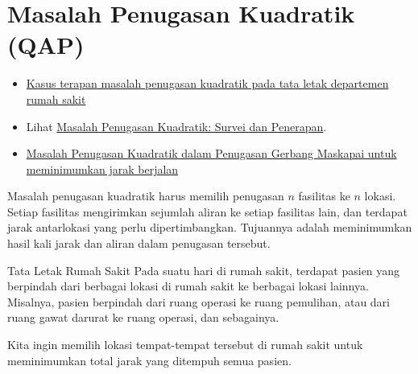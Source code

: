 \section{Masalah Penugasan Kuadratik (QAP)}
\begin{resource}{}{}
\begin{itemize}
\item \href{https://ieeexplore-ieee-org.ezproxy.lib.vt.edu/stamp/stamp.jsp?tp=&arnumber=7170278}{Kasus terapan masalah penugasan kuadratik pada tata letak departemen rumah sakit}
\item Lihat \href{https://www.semanticscholar.org/paper/Quadratic-Assignment-Problem%3A-A-survey-and-Shawky-Metwally/247b45613d6d3b6961fdad44f9e7fefb70fd3e82}{Masalah Penugasan Kuadratik: Survei dan Penerapan}.
\item \href{https://vtechworks.lib.vt.edu/server/api/core/bitstreams/06b13a4f-d1a9-452c-957f-b0bdd1619c76/content}{Masalah Penugasan Kuadratik dalam Penugasan Gerbang Maskapai untuk meminimumkan jarak berjalan}
\end{itemize}
\end{resource}
Masalah penugasan kuadratik harus memilih penugasan $n$ fasilitas ke $n$ lokasi. Setiap fasilitas mengirimkan sejumlah aliran ke setiap fasilitas lain, dan terdapat jarak antarlokasi yang perlu dipertimbangkan.
Tujuannya adalah meminimumkan hasil kali jarak dan aliran dalam penugasan tersebut.


\begin{example}{Tata Letak Rumah Sakit}{}
Pada suatu hari di rumah sakit, terdapat pasien yang berpindah dari berbagai lokasi di rumah sakit ke berbagai lokasi lainnya. Misalnya, pasien berpindah dari ruang operasi ke ruang pemulihan, atau dari ruang gawat darurat ke ruang operasi, dan sebagainya.

Kita ingin memilih lokasi tempat-tempat tersebut di rumah sakit untuk meminimumkan total jarak yang ditempuh semua pasien.
\end{example}







